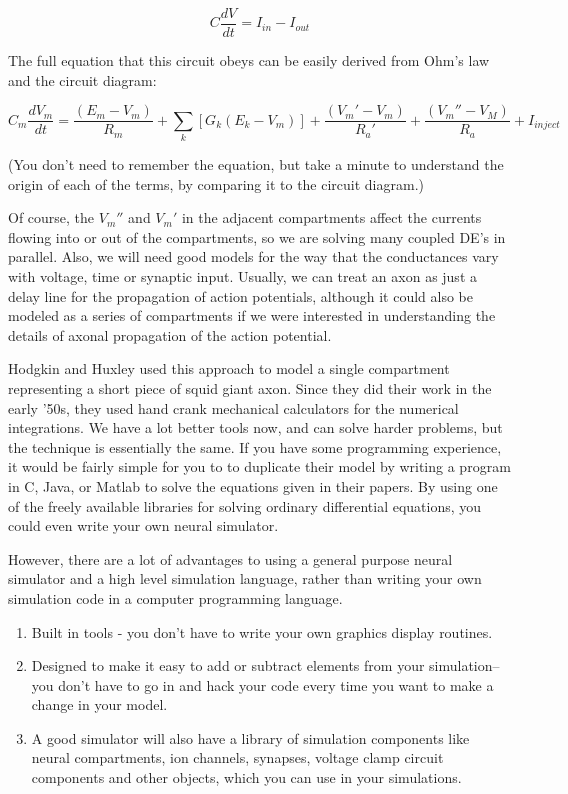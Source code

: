 \documentclass[12pt]{article}
\begin{document}
\begin{displaymath}
		C \frac{dV}{dt} = I_{in} - I_{out}
\end{displaymath}

The full equation that this circuit obeys can be easily derived from Ohm's law and the circuit diagram:

\begin{equation}
		C_m \frac{dV_m}{dt} = \frac{(E_m-V_m)}{R_m}+\sum_k [G_k(E_k-V_m)]+\frac{(V_m'-V_m)}{R_a'} + \frac{(V_m''-V_M)}{R_a} +I_{inject}
\label{eq:eq1}		
\end{equation}

(You don't need to remember the equation, but take a minute to understand the origin of each of the terms, by comparing it to the circuit diagram.)

Of course, the $V_m''$ and $V_m'$ in the adjacent compartments affect the currents flowing into or out of the compartments, so we are solving many coupled DE's in parallel. Also, we will need good models for the way that the conductances vary with voltage, time or synaptic input. Usually, we can treat an axon as just a delay line for the propagation of action potentials, although it could also be modeled as a series of compartments if we were interested in understanding the details of axonal propagation of the action potential.

Hodgkin and Huxley used this approach to model a single compartment representing a short piece of squid giant axon. Since they did their work in the early '50s, they used hand crank mechanical calculators for the numerical integrations. We have a lot better tools now, and can solve harder problems, but the technique is essentially the same. If you have some programming experience, it would be fairly simple for you to to duplicate their model by writing a program in C, Java, or Matlab to solve the equations given in their papers. By using one of the freely available libraries for solving ordinary differential equations, you could even write your own neural simulator.

However, there are a lot of advantages to using a general purpose neural simulator and a high level simulation language, rather than writing your own simulation code in a computer programming language.

\begin{enumerate}
\item Built in tools - you don't have to write your own graphics display routines.

\item Designed to make it easy to add or subtract elements from your simulation--you don't have to go in and hack your code every time you want to make a change in your model.

\item A good simulator will also have a library of simulation components like neural compartments, ion channels, synapses, voltage clamp circuit components and other objects, which you can use in your simulations. 
\end{enumerate}
\end{document}
